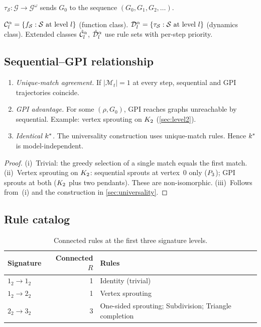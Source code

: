 \documentclass{../shared/primo}
\begin{document}
\begin{definition}
$\tau_{\mathcal{S}}: \mathcal{G} \to \mathcal{G}^{\omega}$ sends $G_0$ to the sequence $(G_0, G_1, G_2, \ldots)$.
\end{definition}

\begin{definition}[Classes]
$\mathcal{C}_{l}^{\alpha} = \{f_{\mathcal{S}} : \mathcal{S} \text{ at level } l\}$ (function class). $\mathcal{D}_{l}^{\alpha} = \{\tau_{\mathcal{S}} : \mathcal{S} \text{ at level } l\}$ (dynamics class). Extended classes $\hat{\mathcal{C}}_{l}^{\alpha}$, $\hat{\mathcal{D}}_{l}^{\alpha}$ use rule sets with per-step priority.
\end{definition}

\subsection{Sequential--GPI relationship}

\begin{proposition}\label{prop:seqgpi}
\leavevmode
\begin{enumerate}
\item[\textup{(i)}] \emph{Unique-match agreement.} If $|\mathcal{M}_t| = 1$ at every step, sequential and GPI trajectories coincide.
\item[\textup{(ii)}] \emph{GPI advantage.} For some $(\rho, G_0)$, GPI reaches graphs unreachable by sequential. Example: vertex sprouting on $K_{2}$ (\cref{sec:level2}).
\item[\textup{(iii)}] \emph{Identical $k^*$.} The universality construction uses unique-match rules. Hence $k^*$ is model-independent.
\end{enumerate}
\end{proposition}

\begin{proof}
(i)~Trivial: the greedy selection of a single match equals the first match. (ii)~Vertex sprouting on $K_{2}$: sequential sprouts at vertex~0 only ($P_{3}$); GPI sprouts at both ($K_{2}$ plus two pendants). These are non-isomorphic. (iii)~Follows from~(i) and the construction in \cref{sec:universality}.
\end{proof}

\subsection{Rule catalog}

\begin{table}[ht]
\centering
\begin{tabular}{lrl}
\toprule
Signature & Connected $R$ & Rules \\
\midrule
$1_2 \to 1_2$ & 1 & Identity (trivial) \\
$1_2 \to 2_2$ & 1 & Vertex sprouting \\
$2_2 \to 3_2$ & 3 & One-sided sprouting; Subdivision; Triangle completion \\
\bottomrule
\end{tabular}
\caption{Connected rules at the first three signature levels.}
\label{tab:catalog}
\end{table}
\end{document}

